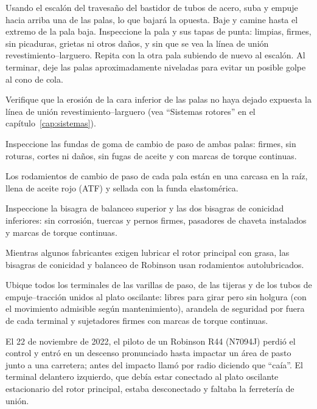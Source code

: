 Usando el escalón del travesaño del bastidor de tubos de acero, suba y empuje hacia arriba una de las palas, lo que bajará la opuesta. Baje y camine hasta el extremo de la pala baja. Inspeccione la pala y sus tapas de punta: limpias, firmes, sin picaduras, grietas ni otros daños, y sin que se vea la línea de unión revestimiento--larguero. Repita con la otra pala subiendo de nuevo al escalón. Al terminar, deje las palas aproximadamente niveladas para evitar un posible golpe al cono de cola.

\begin{precaucion}
Verifique que la erosión de la cara inferior de las palas no haya dejado expuesta la línea de unión revestimiento--larguero (vea ``Sistemas rotores'' en el capítulo~\ref{cap:sistemas}).
\end{precaucion}

Inspeccione las fundas de goma de cambio de paso de ambas palas: firmes, sin roturas, cortes ni daños, sin fugas de aceite y con marcas de torque continuas.

\begin{nota}
Los rodamientos de cambio de paso de cada pala están en una carcasa en la raíz, llena de aceite rojo (ATF) y sellada con la funda elastomérica.
\end{nota}

Inspeccione la bisagra de balanceo superior y las dos bisagras de conicidad inferiores: sin corrosión, tuercas y pernos firmes, pasadores de chaveta instalados y marcas de torque continuas.

\begin{nota}
Mientras algunos fabricantes exigen lubricar el rotor principal con grasa, las bisagras de conicidad y balanceo de Robinson usan rodamientos autolubricados.
\end{nota}

Ubique todos los terminales de las varillas de paso, de las tijeras y de los tubos de empuje--tracción unidos al plato oscilante: libres para girar pero sin holgura (con el movimiento admisible según mantenimiento), arandela de seguridad por fuera de cada terminal y sujetadores firmes con marcas de torque continuas.

\begin{caso}
El 22 de noviembre de 2022, el piloto de un Robinson R44 (N7094J) perdió el control y entró en un descenso pronunciado hasta impactar un área de pasto junto a una carretera; antes del impacto llamó por radio diciendo que ``caía''. El terminal delantero izquierdo, que debía estar conectado al plato oscilante estacionario del rotor principal, estaba desconectado y faltaba la ferretería de unión.
\end{caso}


